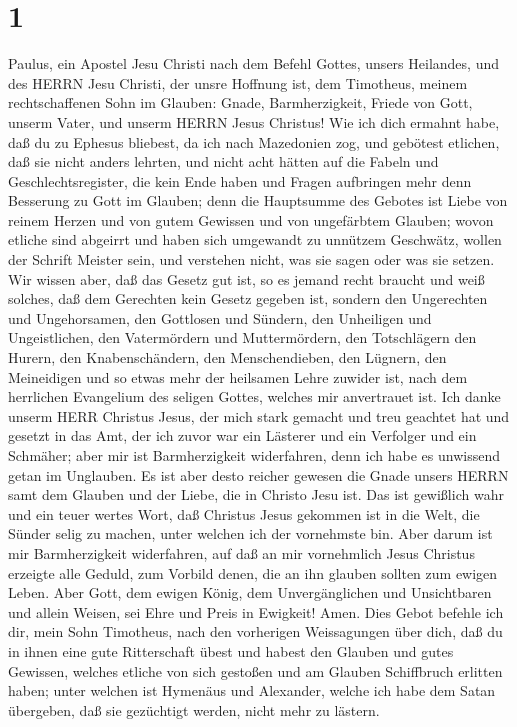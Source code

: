 \hypertarget{section}{%
\section{1}\label{section}}

 Paulus, ein Apostel Jesu Christi nach dem Befehl Gottes,
unsers Heilandes, und des HERRN Jesu Christi, der unsre Hoffnung ist,
 dem Timotheus, meinem rechtschaffenen Sohn im Glauben:
Gnade, Barmherzigkeit, Friede von Gott, unserm Vater, und unserm HERRN
Jesus Christus!  Wie ich dich ermahnt habe, daß du zu
Ephesus bliebest, da ich nach Mazedonien zog, und gebötest etlichen, daß
sie nicht anders lehrten,  und nicht acht hätten auf die
Fabeln und Geschlechtsregister, die kein Ende haben und Fragen
aufbringen mehr denn Besserung zu Gott im Glauben;  denn die
Hauptsumme des Gebotes ist Liebe von reinem Herzen und von gutem
Gewissen und von ungefärbtem Glauben;  wovon etliche sind
abgeirrt und haben sich umgewandt zu unnützem Geschwätz, 
wollen der Schrift Meister sein, und verstehen nicht, was sie sagen oder
was sie setzen.  Wir wissen aber, daß das Gesetz gut ist, so
es jemand recht braucht  und weiß solches, daß dem Gerechten
kein Gesetz gegeben ist, sondern den Ungerechten und Ungehorsamen, den
Gottlosen und Sündern, den Unheiligen und Ungeistlichen, den
Vatermördern und Muttermördern, den Totschlägern  den
Hurern, den Knabenschändern, den Menschendieben, den Lügnern, den
Meineidigen und so etwas mehr der heilsamen Lehre zuwider ist,
 nach dem herrlichen Evangelium des seligen Gottes, welches
mir anvertrauet ist.  Ich danke unserm HERR Christus Jesus,
der mich stark gemacht und treu geachtet hat und gesetzt in das Amt,
 der ich zuvor war ein Lästerer und ein Verfolger und ein
Schmäher; aber mir ist Barmherzigkeit widerfahren, denn ich habe es
unwissend getan im Unglauben.  Es ist aber desto reicher
gewesen die Gnade unsers HERRN samt dem Glauben und der Liebe, die in
Christo Jesu ist.  Das ist gewißlich wahr und ein teuer
wertes Wort, daß Christus Jesus gekommen ist in die Welt, die Sünder
selig zu machen, unter welchen ich der vornehmste bin. 
Aber darum ist mir Barmherzigkeit widerfahren, auf daß an mir
vornehmlich Jesus Christus erzeigte alle Geduld, zum Vorbild denen, die
an ihn glauben sollten zum ewigen Leben.  Aber Gott, dem
ewigen König, dem Unvergänglichen und Unsichtbaren und allein Weisen,
sei Ehre und Preis in Ewigkeit! Amen.  Dies Gebot befehle
ich dir, mein Sohn Timotheus, nach den vorherigen Weissagungen über
dich, daß du in ihnen eine gute Ritterschaft übest  und
habest den Glauben und gutes Gewissen, welches etliche von sich gestoßen
und am Glauben Schiffbruch erlitten haben;  unter welchen
ist Hymenäus und Alexander, welche ich habe dem Satan übergeben, daß sie
gezüchtigt werden, nicht mehr zu lästern.

